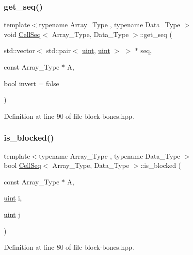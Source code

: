 \subsubsection{\texorpdfstring{get\+\_\+seq()}{get\_seq()}}
{\footnotesize\ttfamily template$<$typename Array\+\_\+\+Type , typename Data\+\_\+\+Type $>$ \\
void \hyperlink{class_cell_seq}{Cell\+Seq}$<$ Array\+\_\+\+Type, Data\+\_\+\+Type $>$\+::get\+\_\+seq (\begin{DoxyParamCaption}\item[{std\+::vector$<$ std\+::pair$<$ \hyperlink{typedefs_8hpp_a91ad9478d81a7aaf2593e8d9c3d06a14}{uint}, \hyperlink{typedefs_8hpp_a91ad9478d81a7aaf2593e8d9c3d06a14}{uint} $>$ $>$ $\ast$}]{seq,  }\item[{const Array\+\_\+\+Type $\ast$}]{A,  }\item[{bool}]{invert = {\ttfamily false} }\end{DoxyParamCaption})\hspace{0.3cm}{\ttfamily [inline]}}



Definition at line 90 of file block-\/bones.\+hpp.

\mbox{\label{class_cell_seq_a32d85d2f118a68b58d1f7a6095ff42ca}} 
\subsubsection{\texorpdfstring{is\+\_\+blocked()}{is\_blocked()}}
{\footnotesize\ttfamily template$<$typename Array\+\_\+\+Type , typename Data\+\_\+\+Type $>$ \\
bool \hyperlink{class_cell_seq}{Cell\+Seq}$<$ Array\+\_\+\+Type, Data\+\_\+\+Type $>$\+::is\+\_\+blocked (\begin{DoxyParamCaption}\item[{const Array\+\_\+\+Type $\ast$}]{A,  }\item[{\hyperlink{typedefs_8hpp_a91ad9478d81a7aaf2593e8d9c3d06a14}{uint}}]{i,  }\item[{\hyperlink{typedefs_8hpp_a91ad9478d81a7aaf2593e8d9c3d06a14}{uint}}]{j }\end{DoxyParamCaption})\hspace{0.3cm}{\ttfamily [inline]}}



Definition at line 80 of file block-\/bones.\+hpp.



